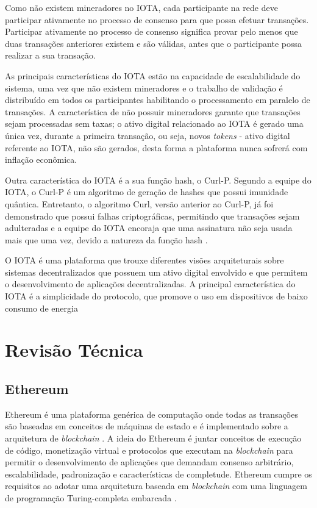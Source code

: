 \documentclass[tcc,capa]{texufpel}
\begin{document}
    Como não existem mineradores no IOTA, cada participante na rede deve participar ativamente no processo de consenso para que possa efetuar transações. Participar ativamente no processo de consenso significa provar pelo menos que duas transações anteriores existem e são válidas, antes que o participante possa realizar a sua transação.
    
    As principais características do IOTA estão na capacidade de escalabilidade do sistema, uma vez que não existem mineradores e o trabalho de validação é distribuído em todos os participantes habilitando o processamento em paralelo de transações. A característica de não possuir mineradores garante que transações sejam processadas sem taxas; o ativo digital relacionado ao IOTA é gerado uma única vez, durante a primeira transação, ou seja, novos \textit{tokens} - ativo digital referente ao IOTA, não são gerados, desta forma a plataforma nunca sofrerá com inflação econômica.
    
    Outra característica do IOTA é a sua função hash, o Curl-P. Segundo a equipe do IOTA, o Curl-P é um algoritmo de geração de hashes que possui imunidade quântica. Entretanto, o algoritmo Curl, versão anterior ao Curl-P, já foi demonstrado que possui falhas criptográficas, permitindo que transações sejam adulteradas \cite{heilman} e a equipe do IOTA encoraja que uma assinatura não seja usada mais que uma vez, devido a natureza da função hash \cite{teamiota}.
    
    O IOTA é uma plataforma que trouxe diferentes visões arquiteturais sobre sistemas decentralizados que possuem um ativo digital envolvido e que permitem o desenvolvimento de aplicações decentralizadas. A principal característica do IOTA é a simplicidade do protocolo, que promove o uso em dispositivos de baixo consumo de energia
    

\chapter{Revisão Técnica}\label{chap:revisao-tecnica}


\section{Ethereum}\label{ssc:ethereum}

    Ethereum é uma plataforma genérica de computação onde todas as transações são baseadas em conceitos de máquinas de estado e é implementado sobre a arquitetura de \textit{blockchain} \cite{wood2014ethereum}. A ideia do Ethereum é juntar conceitos de execução de código, monetização virtual e protocolos que executam na \textit{blockchain} para permitir o desenvolvimento de aplicações que demandam consenso arbitrário, escalabilidade, padronização e características de completude. Ethereum cumpre os requisitos ao adotar uma arquitetura baseada em \textit{blockchain} com uma linguagem de programação Turing-completa embarcada \cite{buterin2014next}.
    
\end{document}

